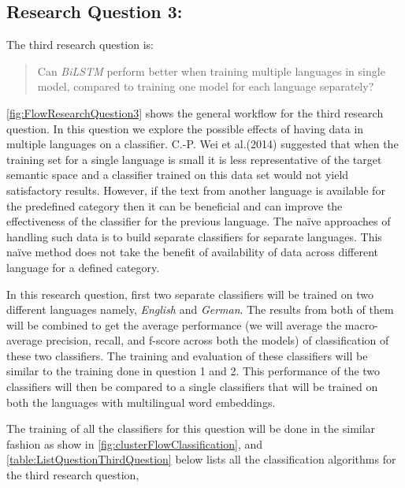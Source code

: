 \subsection{Research Question 3:} \label{question3}

The third research question is:

\begin{quote}
    Can \textit{\gls{BiLSTM}} perform better when training multiple languages in single model, compared to training one model for each language separately?
\end{quote}

\ref{fig:FlowResearchQuestion3} shows the general workflow for the third research question. In this question we explore the possible effects of having data in multiple languages on a classifier. C.-P. Wei et al.(2014)\cite{Wei:2014:EPD:2566999.2567111} suggested that when the training set for a single language is small it is less representative of the target semantic space and a classifier trained on this data set would not yield satisfactory results. However, if the text from another language is available for the predefined category then it can be beneficial and can improve the effectiveness of the classifier for the previous language. The naïve approaches of handling such data is to build separate classifiers for separate languages. This naïve method does not take the benefit of availability of data across different language for a defined category. 

In this research question, first two separate classifiers will be trained on two different languages namely, \textit{English} and \textit{German}. The results from both of them will be combined to get the average performance (we will average the macro-average precision, recall, and f-score across both the models) of classification of these two classifiers. The training and evaluation of these classifiers will be similar to the training done in question 1 and 2. This performance of the two classifiers will then be compared to a single classifiers that will be trained on both the languages with multilingual word embeddings.

The training of all the classifiers for this question will be done in the similar fashion as show in \ref{fig:clusterFlowClassification}, and \ref{table:ListQuestionThirdQuestion} below lists all the classification algorithms for the third research question,


